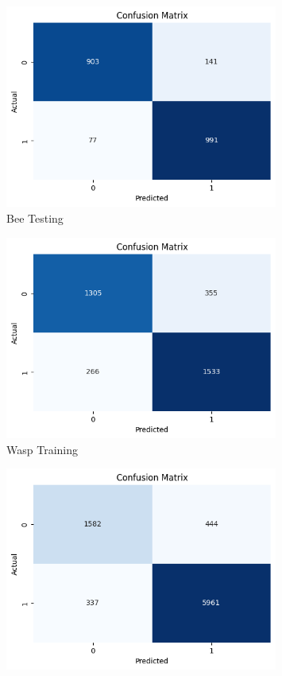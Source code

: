 \documentclass[12pt]{article}
\begin{document}
\begin{enumerate}
\begin{figure}[H]
\begin{minipage}{0.45\textwidth}
				\includegraphics[width=0.8\textwidth]{Images/Confusion/vgg bees test.png} \\ \vspace{0.25 cm}
				Bee Testing
			\end{minipage}
			\newline
			\begin{minipage}{0.45\textwidth}
				\vspace{1.5 cm}
				\centering
				\includegraphics[width=0.8\textwidth]{Images/Confusion/vgg wasps train.png}\\ \vspace{0.25 cm}
				Wasp Training
			\end{minipage}
			\hfill
			\begin{minipage}{0.45\textwidth}
				\centering
				\includegraphics[width=0.8\textwidth]{Images/Confusion/vgg wasps test.png}\\ \vspace{0.25 cm}

\end{minipage}
\end{figure}
\end{enumerate}
\end{document}
